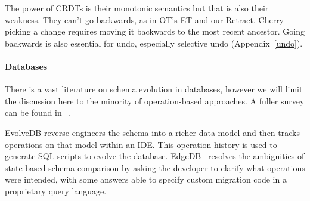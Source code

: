 \documentclass[english,submission]{programming}
\theoremstyle{definition}
\newcommand{\citet}[1]{\citeauthor*{#1}~\cite{#1}}
\newcommand{\myparagraph}[1]{\vspace{-8pt}\paragraph{#1}}
\begin{document}
The power of CRDTs is their monotonic semantics but that is also their weakness. They can't go backwards, as in OT's ET and our \textsf{Retract}. Cherry picking a change requires moving it backwards to the most recent ancestor. Going backwards is also essential for undo, especially selective undo (Appendix~\ref{undo}).

\myparagraph{Databases}

There is a vast literature on schema evolution in databases, however we will limit the discussion here to the minority of operation-based approaches. A fuller survey can be found in \citet{challenge-problems}.


EvolveDB\cite{evolvedb} reverse-engineers the schema into a richer data model and then tracks operations on that model within an IDE. This operation history is used to generate SQL scripts to evolve the database. EdgeDB~\cite{edgedb} resolves the ambiguities of state-based schema comparison by asking the developer to clarify what operations were intended, with some answers able to specify custom migration code in a proprietary query language.
\end{document}
